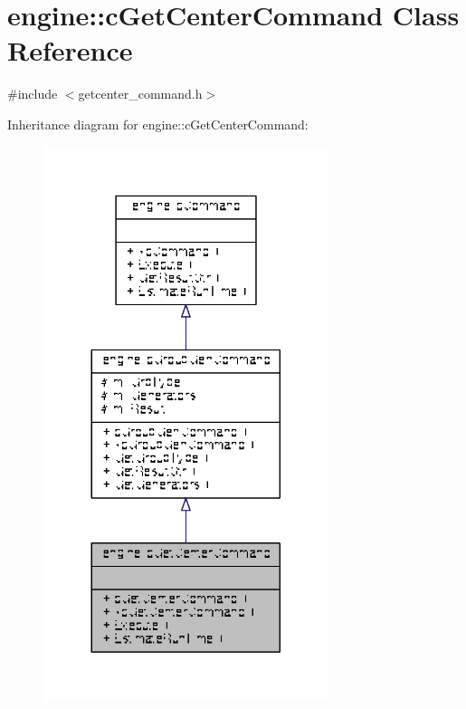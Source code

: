 \hypertarget{classengine_1_1cGetCenterCommand}{\section{engine\-:\-:c\-Get\-Center\-Command Class Reference}
\label{classengine_1_1cGetCenterCommand}
}


{\ttfamily \#include $<$getcenter\-\_\-command.\-h$>$}



Inheritance diagram for engine\-:\-:c\-Get\-Center\-Command\-:
\nopagebreak
\begin{figure}[H]
\begin{center}
\leavevmode
\includegraphics[width=236pt]{classengine_1_1cGetCenterCommand__inherit__graph}
\end{center}
\end{figure}


